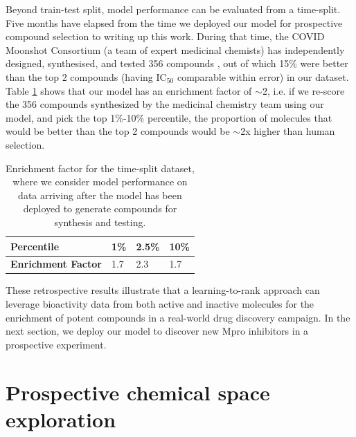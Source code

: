 
Beyond train-test split, model performance can be evaluated from a time-split. Five months have elapsed from the time we deployed our model for prospective compound selection to writing up this work. During that time, the COVID Moonshot Consortium (a team of expert medicinal chemists) has independently designed, synthesised, and tested 356 compounds \cite{moonshot2020covid}, out of which 15\% were better than the top 2 compounds (having $\mathrm{IC}_{50}$ comparable within error) in our dataset. Table \ref{table:time_split} shows that our model has an enrichment factor of $\sim$2, i.e. if we re-score the 356 compounds synthesized by the medicinal chemistry team using our model, and pick the top 1\%-10\% percentile, the proportion of molecules that would be better than the top 2 compounds would be $\sim$2x higher than human selection. 

\begin{table}[!bh]
 \centering
 \begin{tabular}{|l|l|l|l|}
 \hline
 \textbf{Percentile} & 1\% & 2.5\% & 10\% \\ \hline
 \textbf{Enrichment Factor} & 1.7 & 2.3 & 1.7 \\ \hline
 \end{tabular}
 \caption{Enrichment factor for the time-split dataset, where we consider model performance on data arriving after the model has been deployed to generate compounds for synthesis and testing. }
 \label{table:time_split}
\end{table}

These retrospective results illustrate that a learning-to-rank approach can leverage bioactivity data from both active and inactive molecules for the enrichment of potent compounds in a real-world drug discovery campaign. In the next section, we deploy our model to discover new Mpro inhibitors in a prospective experiment.

\section{Prospective chemical space exploration}

